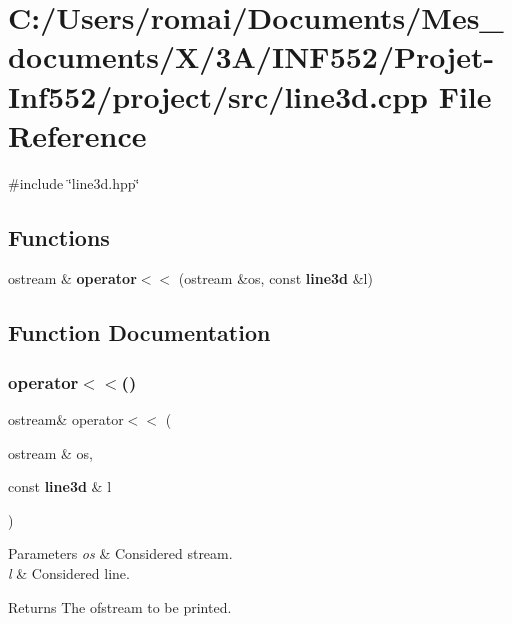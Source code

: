 \section{C\+:/\+Users/romai/\+Documents/\+Mes\+\_\+documents/\+X/3\+A/\+I\+N\+F552/\+Projet-\/\+Inf552/project/src/line3d.cpp File Reference}
\label{line3d_8cpp}
{\ttfamily \#include \char`\"{}line3d.\+hpp\char`\"{}}\newline
\subsection*{Functions}
\begin{DoxyCompactItemize}
\item 
ostream \& \textbf{ operator$<$$<$} (ostream \&os, const \textbf{ line3d} \&l)
\end{DoxyCompactItemize}


\subsection{Function Documentation}
\mbox{\label{line3d_8cpp_aa9bf6fbe3751bb3e1bbb768fab7e1309}} 
\subsubsection{operator$<$$<$()}
{\footnotesize\ttfamily ostream\& operator$<$$<$ (\begin{DoxyParamCaption}\item[{ostream \&}]{os,  }\item[{const \textbf{ line3d} \&}]{l }\end{DoxyParamCaption})}


\begin{DoxyParams}{Parameters}
{\em os} & Considered stream. \\
\hline
{\em l} & Considered line. \\
\hline
\end{DoxyParams}
\begin{DoxyReturn}{Returns}
The ofstream to be printed. 
\end{DoxyReturn}
